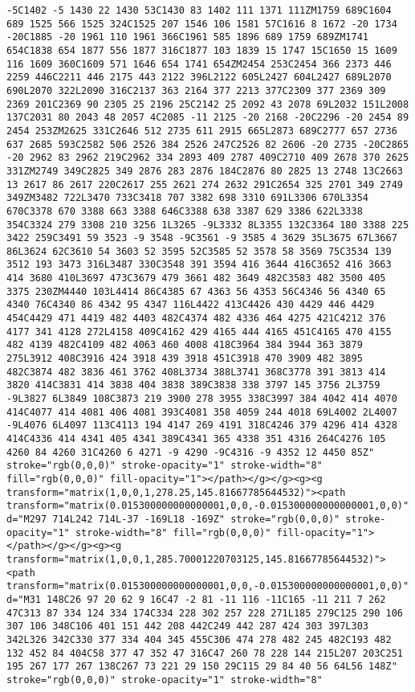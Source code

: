 \documentclass[
]{article}
\begin{document}
\begin{verbatim}
-5C1402 -5 1430 22 1430 53C1430 83 1402 111 1371 111ZM1759 689C1604 689 1525 566 1525 324C1525 207 1546 106 1581 57C1616 8 1672 -20 1734 -20C1885 -20 1961 110 1961 366C1961 585 1896 689 1759 689ZM1741 654C1838 654 1877 556 1877 316C1877 103 1839 15 1747 15C1650 15 1609 116 1609 360C1609 571 1646 654 1741 654ZM2454 253C2454 366 2373 446 2259 446C2211 446 2175 443 2122 396L2122 605L2427 604L2427 689L2070 690L2070 322L2090 316C2137 363 2164 377 2213 377C2309 377 2369 309 2369 201C2369 90 2305 25 2196 25C2142 25 2092 43 2078 69L2032 151L2008 137C2031 80 2043 48 2057 4C2085 -11 2125 -20 2168 -20C2296 -20 2454 89 2454 253ZM2625 331C2646 512 2735 611 2915 665L2873 689C2777 657 2736 637 2685 593C2582 506 2526 384 2526 247C2526 82 2606 -20 2735 -20C2865 -20 2962 83 2962 219C2962 334 2893 409 2787 409C2710 409 2678 370 2625 331ZM2749 349C2825 349 2876 283 2876 184C2876 80 2825 13 2748 13C2663 13 2617 86 2617 220C2617 255 2621 274 2632 291C2654 325 2701 349 2749 349ZM3482 722L3470 733C3418 707 3382 698 3310 691L3306 670L3354 670C3378 670 3388 663 3388 646C3388 638 3387 629 3386 622L3338 354C3324 279 3308 210 3256 1L3265 -9L3332 8L3355 132C3364 180 3388 225 3422 259C3491 59 3523 -9 3548 -9C3561 -9 3585 4 3629 35L3675 67L3667 86L3624 62C3610 54 3603 52 3595 52C3585 52 3578 58 3569 75C3534 139 3512 193 3473 316L3487 330C3548 391 3594 416 3644 416C3652 416 3663 414 3680 410L3697 473C3679 479 3661 482 3649 482C3583 482 3500 405 3375 230ZM4440 103L4414 86C4385 67 4363 56 4353 56C4346 56 4340 65 4340 76C4340 86 4342 95 4347 116L4422 413C4426 430 4429 446 4429 454C4429 471 4419 482 4403 482C4374 482 4336 464 4275 421C4212 376 4177 341 4128 272L4158 409C4162 429 4165 444 4165 451C4165 470 4155 482 4139 482C4109 482 4063 460 4008 418C3964 384 3944 363 3879 275L3912 408C3916 424 3918 439 3918 451C3918 470 3909 482 3895 482C3874 482 3836 461 3762 408L3734 388L3741 368C3778 391 3813 414 3820 414C3831 414 3838 404 3838 389C3838 338 3797 145 3756 2L3759 -9L3827 6L3849 108C3873 219 3900 278 3955 338C3997 384 4042 414 4070 414C4077 414 4081 406 4081 393C4081 358 4059 244 4018 69L4002 2L4007 -9L4076 6L4097 113C4113 194 4147 269 4191 318C4246 379 4296 414 4328 414C4336 414 4341 405 4341 389C4341 365 4338 351 4316 264C4276 105 4260 84 4260 31C4260 6 4271 -9 4290 -9C4316 -9 4352 12 4450 85Z" stroke="rgb(0,0,0)" stroke-opacity="1" stroke-width="8" fill="rgb(0,0,0)" fill-opacity="1"></path></g></g><g><g transform="matrix(1,0,0,1,278.25,145.81667785644532)"><path transform="matrix(0.015300000000000001,0,0,-0.015300000000000001,0,0)" d="M297 714L242 714L-37 -169L18 -169Z" stroke="rgb(0,0,0)" stroke-opacity="1" stroke-width="8" fill="rgb(0,0,0)" fill-opacity="1"></path></g></g><g><g transform="matrix(1,0,0,1,285.70001220703125,145.81667785644532)"><path transform="matrix(0.015300000000000001,0,0,-0.015300000000000001,0,0)" d="M31 148C26 97 20 62 9 16C47 -2 81 -11 116 -11C165 -11 211 7 262 47C313 87 334 124 334 174C334 228 302 257 228 271L185 279C125 290 106 307 106 348C106 401 151 442 208 442C249 442 287 424 303 397L303 342L326 342C330 377 334 404 345 455C306 474 278 482 245 482C193 482 132 452 84 404C58 377 47 352 47 316C47 260 78 228 144 215L207 203C251 195 267 177 267 138C267 73 221 29 150 29C115 29 84 40 56 64L56 148Z" stroke="rgb(0,0,0)" stroke-opacity="1" stroke-width="8" 
\end{verbatim}
\end{document}
